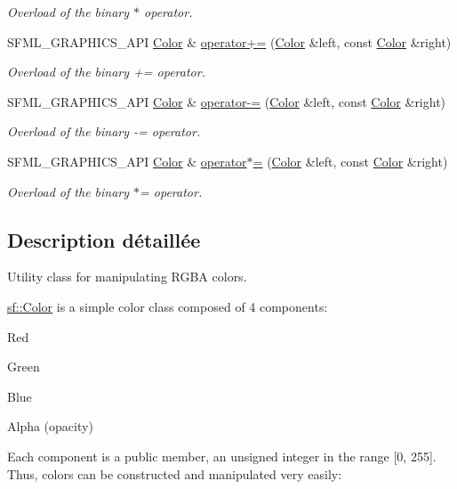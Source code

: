 \begin{DoxyCompactItemize}
\begin{DoxyCompactList}\small\item\em Overload of the binary $\ast$ operator. \end{DoxyCompactList}\item 
S\+F\+M\+L\+\_\+\+G\+R\+A\+P\+H\+I\+C\+S\+\_\+\+A\+PI \hyperlink{classsf_1_1Color}{Color} \& \hyperlink{classsf_1_1Color_a19917f2453a4acfd69de2539bfab8031}{operator+=} (\hyperlink{classsf_1_1Color}{Color} \&left, const \hyperlink{classsf_1_1Color}{Color} \&right)
\begin{DoxyCompactList}\small\item\em Overload of the binary += operator. \end{DoxyCompactList}\item 
S\+F\+M\+L\+\_\+\+G\+R\+A\+P\+H\+I\+C\+S\+\_\+\+A\+PI \hyperlink{classsf_1_1Color}{Color} \& \hyperlink{classsf_1_1Color_a86ceee6b959136932020db4036918ecd}{operator-\/=} (\hyperlink{classsf_1_1Color}{Color} \&left, const \hyperlink{classsf_1_1Color}{Color} \&right)
\begin{DoxyCompactList}\small\item\em Overload of the binary -\/= operator. \end{DoxyCompactList}\item 
S\+F\+M\+L\+\_\+\+G\+R\+A\+P\+H\+I\+C\+S\+\_\+\+A\+PI \hyperlink{classsf_1_1Color}{Color} \& \hyperlink{classsf_1_1Color_a8953be58a47ced92fb25966d6ee90511}{operator$\ast$=} (\hyperlink{classsf_1_1Color}{Color} \&left, const \hyperlink{classsf_1_1Color}{Color} \&right)
\begin{DoxyCompactList}\small\item\em Overload of the binary $\ast$= operator. \end{DoxyCompactList}\end{DoxyCompactItemize}


\subsection{Description détaillée}
Utility class for manipulating R\+G\+BA colors. 

\hyperlink{classsf_1_1Color}{sf\+::\+Color} is a simple color class composed of 4 components\+: \begin{DoxyItemize}
\item Red \item Green \item Blue \item Alpha (opacity)\end{DoxyItemize}
Each component is a public member, an unsigned integer in the range \mbox{[}0, 255\mbox{]}. Thus, colors can be constructed and manipulated very easily\+:


